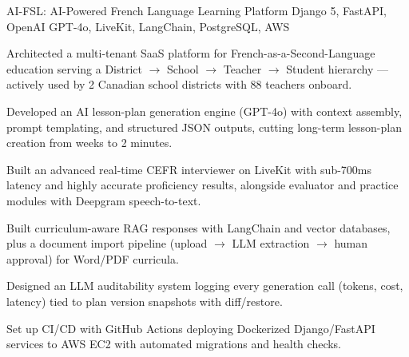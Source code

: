 \resumeSubheading
  {AI-FSL: AI-Powered French Language Learning Platform}{}
  {Django 5, FastAPI, OpenAI GPT-4o, LiveKit, LangChain, PostgreSQL, AWS}{}
  \resumeItemListStart
    \item \small{Architected a multi-tenant SaaS platform for French-as-a-Second-Language education serving a District $\to$ School $\to$ Teacher $\to$ Student hierarchy --- actively used by 2 Canadian school districts with 88 teachers onboard.}
    \item \small{Developed an AI lesson-plan generation engine (GPT-4o) with context assembly, prompt templating, and structured JSON outputs, cutting long-term lesson-plan creation from weeks to 2 minutes.}
    \item \small{Built an advanced real-time CEFR interviewer on LiveKit with sub-700ms latency and highly accurate proficiency results, alongside evaluator and practice modules with Deepgram speech-to-text.}
    \item \small{Built curriculum-aware RAG responses with LangChain and vector databases, plus a document import pipeline (upload $\to$ LLM extraction $\to$ human approval) for Word/PDF curricula.}
    \item \small{Designed an LLM auditability system logging every generation call (tokens, cost, latency) tied to plan version snapshots with diff/restore.}
    \item \small{Set up CI/CD with GitHub Actions deploying Dockerized Django/FastAPI services to AWS EC2 with automated migrations and health checks.}
  \resumeItemListEnd
